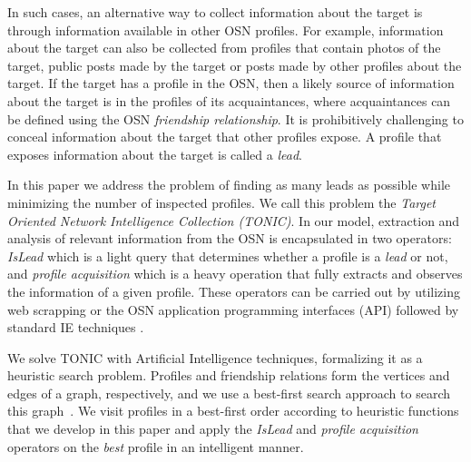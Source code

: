 \documentclass[journal]{IEEEtran}
\begin{document}
In such cases, an alternative way to collect information about the target is through information available in other OSN profiles. 
For example, information about the target can also be collected  from profiles that contain photos of the target, public posts made by the target or posts made by other profiles about the target.
If the target has a profile in the OSN, then a likely source of information about the target is in the profiles of its acquaintances, where acquaintances can be defined using the OSN {\em friendship relationship}.   
It is prohibitively challenging to conceal information about the target that other profiles expose.
A profile that exposes information about the target is called a {\em lead}.




In this paper we address the problem of finding as many leads as possible while minimizing the number of inspected profiles. We call this problem the {\em Target Oriented Network Intelligence Collection (TONIC)}. 
In our model, extraction and analysis of relevant information from the OSN is encapsulated in two operators: {\em IsLead} which is a light query that determines whether a profile is a {\em lead} or not, and {\em profile acquisition} which is a heavy operation that fully extracts and observes the information of a given profile.
These operators can be carried out by utilizing web scrapping or the OSN application programming interfaces (API) followed by standard IE techniques \cite{chang2006survey,tang2010aCombinationApproach,pawlas2012universal}. 


We solve TONIC with Artificial Intelligence techniques, formalizing it as a heuristic search problem.  Profiles and friendship relations form the vertices and edges of a  graph, respectively, and we use a best-first search approach to search this graph~\cite{vempaty1991depthFirst,russell2010artificialIntelligence}. We visit profiles in a best-first order according to heuristic functions that we develop in this paper and apply the {\em IsLead} and {\em profile acquisition} operators on the {\em best} profile in an intelligent manner. 
\end{document}
